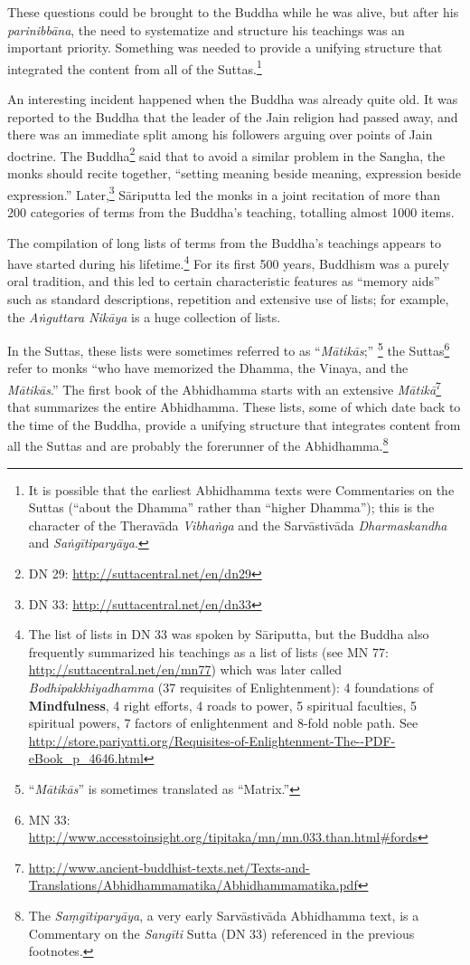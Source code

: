 These questions could be brought to the Buddha while he was alive, but after his \textit{parinibbāna}, the need to systematize and structure his teachings was an important priority. Something was needed to provide a unifying structure that integrated the content from all of the Suttas.\footnote{It is possible that the earliest Abhidhamma texts were Commentaries on the Suttas (“about the Dhamma” rather than “higher Dhamma”); this is the character of the Theravāda \textit{Vibhaṅga} and the Sarvāstivāda \textit{Dharmaskandha} and \textit{Saṅgītiparyāya}.}

An interesting incident happened when the Buddha was already quite old. It was reported to the Buddha that the leader of the Jain religion had passed away, and there was an immediate split among his followers arguing over points of Jain doctrine. The Buddha\footnote{DN 29: \url{http://suttacentral.net/en/dn29}} said that to avoid a similar problem in the Sangha, the monks should recite together, “setting meaning beside meaning, expression beside expression.” Later,\footnote{DN 33: \url{http://suttacentral.net/en/dn33}} Sāriputta led the monks in a joint recitation of more than 200 categories of terms from the Buddha’s teaching, totalling almost 1000 items. 

The compilation of long lists of terms from the Buddha’s teachings appears to have started during his lifetime.\footnote{The list of lists in DN 33 was spoken by Sāriputta, but the Buddha also frequently summarized his teachings as a list of lists (see MN 77: \url{http://suttacentral.net/en/mn77}) which was later called \textit{Bodhipakkhiyadhamma} (37 requisites of Enlightenment): 4 foundations of \textbf{Mindfulness}, 4 right efforts, 4 roads to power, 5 spiritual faculties, 5 spiritual powers, 7 factors of enlightenment and 8-fold noble path. See \url{http://store.pariyatti.org/Requisites-of-Enlightenment-The--PDF-eBook_p_4646.html}} For its first 500 years, Buddhism was a purely oral tradition, and this led to certain characteristic features as “memory aids” such as standard descriptions, repetition and extensive use of lists; for example, the \textit{Aṅguttara Nikāya} is a huge collection of lists. 

In the Suttas, these lists were sometimes referred to as “\textit{Mātikās};” \footnote{“\textit{Mātikās}” is sometimes translated as “Matrix.”} the Suttas\footnote{MN 33: \url{http://www.accesstoinsight.org/tipitaka/mn/mn.033.than.html\#fords}} refer to monks “who have memorized the Dhamma, the Vinaya, and the \textit{Mātikās}.” The first book of the Abhidhamma starts with an extensive \textit{Mātikā}\footnote{\url{http://www.ancient-buddhist-texts.net/Texts-and-Translations/Abhidhammamatika/Abhidhammamatika.pdf}} that summarizes the entire Abhidhamma. These lists, some of which date back to the time of the Buddha, provide a unifying structure that integrates content from all the Suttas and are probably the forerunner of the Abhidhamma.\footnote{The \textit{Saṃgītiparyāya}, a very early Sarvāstivāda Abhidhamma text, is a Commentary on the \textit{Sangīti} Sutta (DN 33) referenced in the previous footnotes.}

